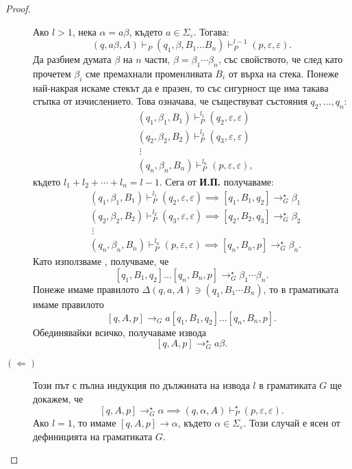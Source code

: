 \begin{proof}
\begin{description}
    Ако $l > 1$, нека $\alpha = a\beta$, където $a \in \Sigma_\varepsilon$. Тогава:
    \[(q,a\beta,A) \vdash_P (q_1,\beta,B_1\dots B_n) \vdash^{l-1}_P (p, \varepsilon, \varepsilon).\]
    Да разбием думата $\beta$ на $n$ части, $\beta = \beta_1\cdots \beta_n$, със свойството, че след като прочетем $\beta_i$
    сме премахнали променливата $B_i$ от върха на стека.
    Понеже най-накрая искаме стекът да е празен, то със сигурност ще има такава стъпка от изчислението.
    Това означава, че съществуват състояния $q_2,\dots,q_{n}$:
    \begin{align*}
      & (q_1, \beta_1, B_1) \vdash^{l_1}_P (q_{2},\varepsilon,\varepsilon)\\
      & (q_2, \beta_2, B_2) \vdash^{l_2}_P (q_{3},\varepsilon,\varepsilon)\\
      & \ \vdots\\
      & (q_n, \beta_n, B_n) \vdash^{l_n}_P (p,\varepsilon,\varepsilon),
    \end{align*}
    където $l_1+l_2+\cdots+l_n = l-1$.
    Сега от {\bf И.П.} получаваме:
    \begin{align*}
      & (q_1, \beta_1, B_1) \vdash^{l_1}_P (q_{2},\varepsilon,\varepsilon) \implies [q_1,B_1, q_{2}] \to^\star_G \beta_1\\
      & (q_2, \beta_2, B_2) \vdash^{l_2}_P (q_{3},\varepsilon,\varepsilon) \implies [q_2,B_2, q_{3}] \to^\star_G \beta_2\\
      & \ \vdots\\
      & (q_n, \beta_n, B_n) \vdash^{l_n}_P (p,\varepsilon,\varepsilon) \implies [q_n,B_n, p] \to^\star_G \beta_n.
    \end{align*}
    Като използваме , получваме, че
    \[[q_1,B_1,q_2]\dots[q_n,B_n,p] \to^\star_G \beta_1\cdots\beta_n.\]
    Понеже имаме правилото $\Delta(q,a,A) \ni (q_1,B_1\cdots B_n)$, то в граматиката имаме правилото
    \[[q,A,p] \rightarrow_G a[q_1,B_1,q_2]\dots[q_n,B_n,p].\]
    Обединявайки всичко, получаваме извода
    \[[q,A,p] \rightarrow^\star_G a\beta.\]
  \item[$(\Leftarrow)$]
    Този път с пълна индукция по дължината на извода $l$ в граматиката $G$ ще докажем, че
    \[[q,A,p] \rightarrow^\star_G \alpha \implies (q,\alpha,A) \vdash^\star_P (p,\varepsilon,\varepsilon).\]
    Ако $l = 1$, то имаме $[q,A,p] \rightarrow \alpha$, където $\alpha \in \Sigma_\varepsilon$.
    Този случай е ясен от дефиницията на граматиката $G$.


\end{description}
\end{proof}
